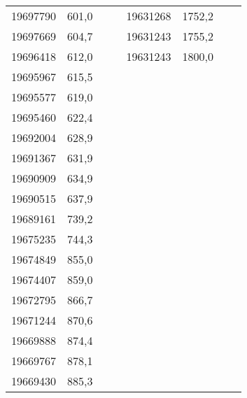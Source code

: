 \documentclass[11pt]{article}
\begin{document}
{{\begin{tabular}{|c|c|cc|c|c|cc}
            19697790 & 601,0 &  &  & 19631268 & 1752,2 &  & \tabularnewline
            \cline{1-2} \cline{5-6} 
            19697669 & 604,7 &  &  & 19631243 & 1755,2 &  & \tabularnewline
            \cline{1-2} \cline{5-6} 
            19696418 & 612,0 &  &  & 19631243 & 1800,0 &  & \tabularnewline
            \cline{1-2} \cline{5-6} 
            19695967 & 615,5 &  & \multicolumn{1}{c}{} & \multicolumn{1}{c}{} & \multicolumn{1}{c}{} &  & \tabularnewline
            \cline{1-2} 
            19695577 & 619,0 &  & \multicolumn{1}{c}{} & \multicolumn{1}{c}{} & \multicolumn{1}{c}{} &  & \tabularnewline
            \cline{1-2} 
            19695460 & 622,4 &  & \multicolumn{1}{c}{} & \multicolumn{1}{c}{} & \multicolumn{1}{c}{} &  & \tabularnewline
            \cline{1-2} 
            19692004 & 628,9 &  & \multicolumn{1}{c}{} & \multicolumn{1}{c}{} & \multicolumn{1}{c}{} &  & \tabularnewline
            \cline{1-2} 
            19691367 & 631,9 &  & \multicolumn{1}{c}{} & \multicolumn{1}{c}{} & \multicolumn{1}{c}{} &  & \tabularnewline
            \cline{1-2} 
            19690909 & 634,9 &  & \multicolumn{1}{c}{} & \multicolumn{1}{c}{} & \multicolumn{1}{c}{} &  & \tabularnewline
            \cline{1-2} 
            19690515 & 637,9 &  & \multicolumn{1}{c}{} & \multicolumn{1}{c}{} & \multicolumn{1}{c}{} &  & \tabularnewline
            \cline{1-2} 
            19689161 & 739,2 &  & \multicolumn{1}{c}{} & \multicolumn{1}{c}{} & \multicolumn{1}{c}{} &  & \tabularnewline
            \cline{1-2} 
            19675235 & 744,3 &  & \multicolumn{1}{c}{} & \multicolumn{1}{c}{} & \multicolumn{1}{c}{} &  & \tabularnewline
            \cline{1-2} 
            19674849 & 855,0 &  & \multicolumn{1}{c}{} & \multicolumn{1}{c}{} & \multicolumn{1}{c}{} &  & \tabularnewline
            \cline{1-2} 
            19674407 & 859,0 &  & \multicolumn{1}{c}{} & \multicolumn{1}{c}{} & \multicolumn{1}{c}{} &  & \tabularnewline
            \cline{1-2} 
            19672795 & 866,7 &  & \multicolumn{1}{c}{} & \multicolumn{1}{c}{} & \multicolumn{1}{c}{} &  & \tabularnewline
            \cline{1-2} 
            19671244 & 870,6 &  & \multicolumn{1}{c}{} & \multicolumn{1}{c}{} & \multicolumn{1}{c}{} &  & \tabularnewline
            \cline{1-2} 
            19669888 & 874,4 &  & \multicolumn{1}{c}{} & \multicolumn{1}{c}{} & \multicolumn{1}{c}{} &  & \tabularnewline
            \cline{1-2} 
            19669767 & 878,1 &  & \multicolumn{1}{c}{} & \multicolumn{1}{c}{} & \multicolumn{1}{c}{} &  & \tabularnewline
            \cline{1-2} 
            19669430 & 885,3 &  & \multicolumn{1}{c}{} & \multicolumn{1}{c}{} & \multicolumn{1}{c}{} &  & \tabularnewline

\end{tabular}}}
\end{document}
